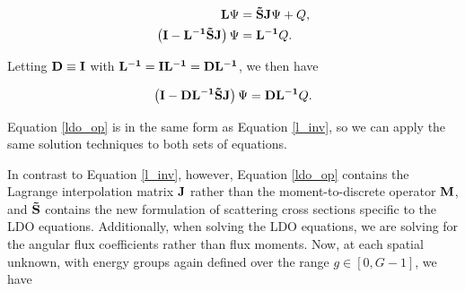 \begin{align}
\mathbf{L}\Psi &= \mathbf{\tilde{S}J}\Psi + Q, \\
\left(\mathbf{I} - \mathbf{L^{-1} \tilde{S}J}\right)\Psi &= \mathbf{L^{-1}}Q.
\end{align}

\noindent Letting $\mathbf{D} \equiv \mathbf{I}$ with 
$\mathbf{L^{-1}} = \mathbf{I}\mathbf{L^{-1}} = \mathbf{D}\mathbf{L^{-1}}$, we then have

\begin{equation}
\left(\mathbf{I} - \mathbf{D L^{-1} \tilde{S}J}\right)\Psi = \mathbf{D L^{-1}}Q.
\label{ldo_op}
\end{equation}

\noindent Equation \ref{ldo_op} is in the same form as Equation \ref{l_inv}, so we 
can apply the same solution techniques to both sets of equations.

In contrast to Equation \ref{l_inv}, however, Equation \ref{ldo_op} contains the 
Lagrange interpolation matrix $\mathbf{J}$ rather than the moment-to-discrete operator 
$\mathbf{M}$, and $\mathbf{\tilde{S}}$ contains the new formulation of scattering cross 
sections specific to the LDO equations. Additionally, when solving the LDO equations, 
we are solving for the angular flux coefficients rather than flux moments.
Now, at each spatial unknown, with energy groups 
again defined over the range $g\in[0,G-1]$, we have

